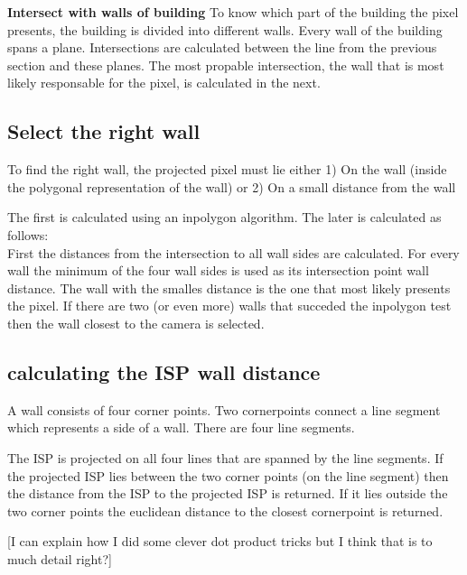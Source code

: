\textbf{Intersect with walls of building}
To know which part of the building the pixel presents, the building is divided into different walls.
Every wall of the building spans a plane. Intersections are calculated between the line from the previous section and these planes.
The most propable intersection, the wall that is most likely responsable for the pixel, is calculated in the next.

\subsection{Select the right wall}
To find the right wall, the projected pixel must lie either
1) On the wall (inside the polygonal representation of the wall)
or
2) On a small distance from the wall

The first is calculated using an inpolygon algorithm.
The later is calculated as follows:
\\
First the distances from the intersection to all wall sides are calculated. For every wall the minimum of the four wall sides is used as its intersection point wall distance.
The wall with the smalles distance is the one that most likely presents the pixel. If there are two (or even more) walls that succeded the inpolygon test then the wall closest to the camera is selected.

\subsection{calculating the ISP wall distance}
A wall consists of four corner points. Two cornerpoints connect a line segment which represents a side of a wall. There are four line segments.

The ISP is projected on all four lines that are spanned by the line segments.
If the projected ISP lies between the two corner points (on the line segment) then the distance from the ISP to the projected ISP is returned.
If it lies outside the two corner points the euclidean distance to the closest cornerpoint is returned.

[I can explain how I did some clever dot product tricks but I think that is to much detail right?]



